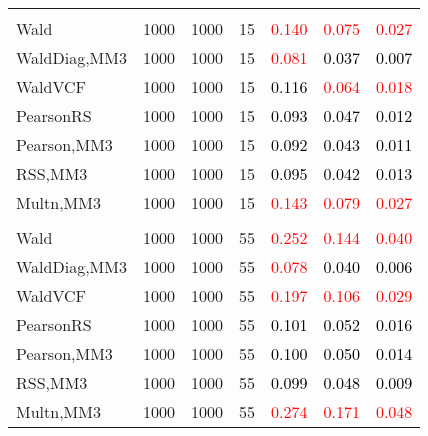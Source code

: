 \documentclass[
]{article}
\begin{document}
\begin{table}[H]
{\begin{tabular}[t]{lrrrrrr}
\addlinespace[0.3em]
\multicolumn{7}{l}{\textbf{2F 10V}}\\
\hspace{1em}Wald & 1000 & 1000 & 15 & \textcolor{red}{0.140} & \textcolor{red}{0.075} & \textcolor{red}{0.027}\\
\hspace{1em}WaldDiag,MM3 & 1000 & 1000 & 15 & \textcolor{red}{0.081} & \textcolor{black}{0.037} & \textcolor{black}{0.007}\\
\hspace{1em}WaldVCF & 1000 & 1000 & 15 & \textcolor{black}{0.116} & \textcolor{red}{0.064} & \textcolor{red}{0.018}\\
\hspace{1em}PearsonRS & 1000 & 1000 & 15 & \textcolor{black}{0.093} & \textcolor{black}{0.047} & \textcolor{black}{0.012}\\
\hspace{1em}Pearson,MM3 & 1000 & 1000 & 15 & \textcolor{black}{0.092} & \textcolor{black}{0.043} & \textcolor{black}{0.011}\\
\hspace{1em}RSS,MM3 & 1000 & 1000 & 15 & \textcolor{black}{0.095} & \textcolor{black}{0.042} & \textcolor{black}{0.013}\\
\hspace{1em}Multn,MM3 & 1000 & 1000 & 15 & \textcolor{red}{0.143} & \textcolor{red}{0.079} & \textcolor{red}{0.027}\\
\addlinespace[0.3em]
\multicolumn{7}{l}{\textbf{3F 15V}}\\
\hspace{1em}Wald & 1000 & 1000 & 55 & \textcolor{red}{0.252} & \textcolor{red}{0.144} & \textcolor{red}{0.040}\\
\hspace{1em}WaldDiag,MM3 & 1000 & 1000 & 55 & \textcolor{red}{0.078} & \textcolor{black}{0.040} & \textcolor{black}{0.006}\\
\hspace{1em}WaldVCF & 1000 & 1000 & 55 & \textcolor{red}{0.197} & \textcolor{red}{0.106} & \textcolor{red}{0.029}\\
\hspace{1em}PearsonRS & 1000 & 1000 & 55 & \textcolor{black}{0.101} & \textcolor{black}{0.052} & \textcolor{black}{0.016}\\
\hspace{1em}Pearson,MM3 & 1000 & 1000 & 55 & \textcolor{black}{0.100} & \textcolor{black}{0.050} & \textcolor{black}{0.014}\\
\hspace{1em}RSS,MM3 & 1000 & 1000 & 55 & \textcolor{black}{0.099} & \textcolor{black}{0.048} & \textcolor{black}{0.009}\\
\hspace{1em}Multn,MM3 & 1000 & 1000 & 55 & \textcolor{red}{0.274} & \textcolor{red}{0.171} & \textcolor{red}{0.048}\\
\bottomrule
\end{tabular}}
\endgroup{}
\end{table}
\end{document}
